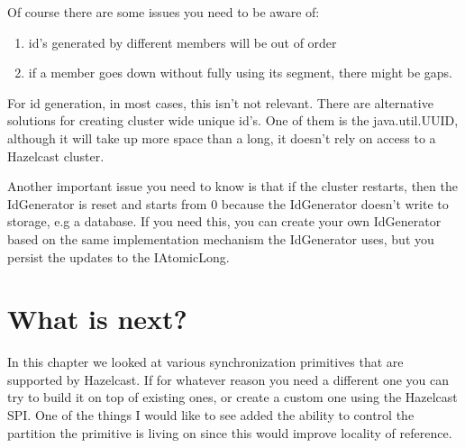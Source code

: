 Of course there are some issues you need to be aware of:
\begin{enumerate}
\item id's generated by different members will be out of order
\item if a member goes down without fully using its segment, there might be gaps.
\end{enumerate}
For id generation, in most cases, this isn't not relevant. There are alternative solutions for creating cluster wide unique id's. One of them is the java.util.UUID, although it will take up more space than a long, it doesn't rely on access to a Hazelcast cluster.

Another important issue you need to know is that if the cluster restarts, then the IdGenerator is reset and starts from 0 because the IdGenerator doesn't write to storage, e.g a database. If you need this, you can create your own IdGenerator based on the same implementation mechanism the IdGenerator uses, but you persist the updates to the IAtomicLong.

\section{What is next?}
In this chapter we looked at various synchronization primitives that are supported by Hazelcast. If for whatever reason you need a different one you can try to build it on top of existing ones, or create a custom one using the Hazelcast SPI. One of the things I would like to see added the ability to control the partition the primitive is living on since this would improve locality of reference. 
